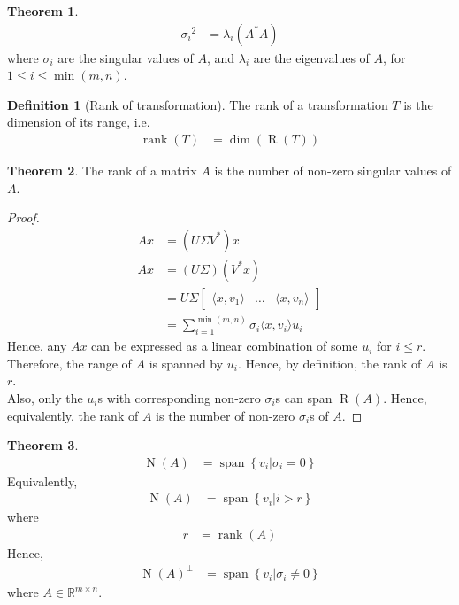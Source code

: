 \documentclass[titlepage, fleqn, a4paper, 12pt, twoside]{article}
\theoremstyle{definition}
\newtheorem{definition}{Definition}
\theoremstyle{theorem}
\newtheorem{theorem}{Theorem}
\DeclareMathOperator{\vspan}{\mathrm{span}}
\DeclareMathOperator{\nullspace}{\mathrm{N}}
\DeclareMathOperator{\range}{\mathrm{R}}
\DeclareMathOperator{\rank}{\mathrm{rank}}
\begin{document}
\begin{theorem}
	\begin{align*}
		{\sigma_i}^2 &= \lambda_i \left( A^* A \right)
	\end{align*}
	where $\sigma_i$ are the singular values of $A$, and $\lambda_i$ are the eigenvalues of $A$, for $1 \le i \le \min(m,n)$.
\end{theorem}

\begin{definition}[Rank of transformation]
	The rank of a transformation $T$ is the dimension of its range, i.e.
	\begin{align*}
		\rank(T) &= \dim\left( \range(T) \right)
	\end{align*}
\end{definition}

\begin{theorem}
	The rank of a matrix $A$ is the number of non-zero singular values of $A$.
\end{theorem}

\begin{proof}
	\begin{align*}
		A x &= \left( U \Sigma V^* \right) x\\
		A x &= (U \Sigma) \left( V^* x \right)\\
		&= U \Sigma
			\begin{bmatrix}
				\langle x,v_1 \rangle & \dots & \langle x,v_n \rangle
			\end{bmatrix}\\
		&= \sum\limits_{i = 1}^{\min(m,n)} \sigma_i \langle x,v_i \rangle u_i
	\end{align*}
	Hence, any $A x$ can be expressed as a linear combination of some $u_i$ for $i \le r$.
	Therefore, the range of $A$ is spanned by $u_i$.
	Hence, by definition, the rank of $A$ is $r$.\\
	Also, only the $u_i$s with corresponding non-zero $\sigma_i$s can span $\range(A)$.
	Hence, equivalently, the rank of $A$ is the number of non-zero $\sigma_i$s of $A$.
\end{proof}

\begin{theorem}
	\begin{align*}
		\nullspace(A) &= \vspan\left\{ v_i \Big| \sigma_i = 0 \right\}
	\end{align*}
	Equivalently,
	\begin{align*}
		\nullspace(A) &= \vspan\left\{ v_i \Big| i > r \right\}
	\end{align*}
	where
	\begin{align*}
		r &= \rank(A)
	\end{align*}
	Hence,
	\begin{align*}
		\nullspace(A)^{\perp} &= \vspan\left\{ v_i \Big| \sigma_i \neq 0 \right\}
	\end{align*}
	where $A \in \mathbb{R}^{m \times n}$.
\end{theorem}
\end{document}
